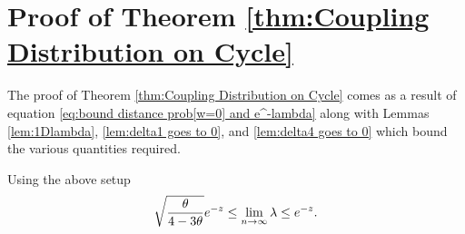 	\section{Proof of Theorem \ref{thm:Coupling Distribution on Cycle}}
	The proof of Theorem \ref{thm:Coupling Distribution on Cycle} comes as a result of equation \eqref{eq:bound distance prob[w=0] and e^-lambda} along with Lemmas \ref{lem:1Dlambda}, \ref{lem:delta1 goes to 0}, and \ref{lem:delta4 goes to 0} which bound the various quantities required.


	\begin{lemma}
	\label{lem:1Dlambda}
		Using the above setup
		\begin{equation}
			\sqrt{\frac{\theta}{4 - 3\theta}}e^{-z} \leq \lim_{n \rightarrow \infty} \lambda \leq e^{-z}.
		\end{equation}
	\end{lemma}
